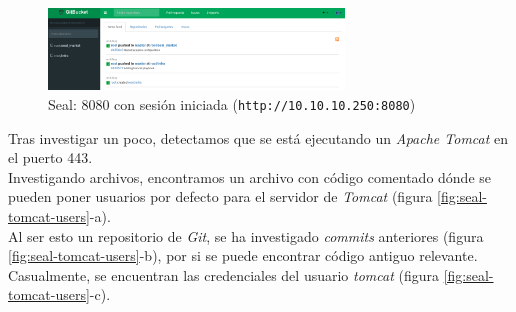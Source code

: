 \begin{figure}[h]
    \centering
    \includegraphics[width=0.70\textwidth]{images/machines/seal/main-logged.png}
    \caption{Seal: 8080 con sesión iniciada (\texttt{http://10.10.10.250:8080})}
    \label{fig:seal-8080-main-logged}
\end{figure}

Tras investigar un poco, detectamos que se está ejecutando un \textit{Apache Tomcat} en el puerto 443.\\

Investigando archivos, encontramos un archivo con código comentado dónde se pueden poner usuarios por defecto para el servidor de \textit{Tomcat} (figura \ref{fig:seal-tomcat-users}-a).\\

Al ser esto un repositorio de \textit{Git}, se ha investigado \textit{commits} anteriores (figura \ref{fig:seal-tomcat-users}-b), por si se puede encontrar código antiguo relevante. Casualmente, se encuentran las credenciales del usuario \textit{tomcat} (figura \ref{fig:seal-tomcat-users}-c).\\

